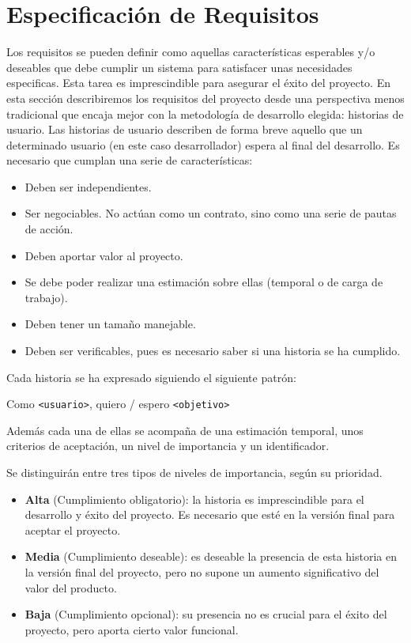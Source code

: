 \chapter{Especificación de Requisitos}
\label{sec::requisitos}
Los requisitos se pueden definir como aquellas características esperables y/o deseables que debe cumplir un sistema para satisfacer unas necesidades especificas. Esta tarea es imprescindible para asegurar el éxito del proyecto. En esta sección describiremos los requisitos del proyecto desde una perspectiva menos tradicional que encaja mejor con la metodología de desarrollo elegida: historias de usuario. Las historias de usuario describen de forma breve aquello que un determinado usuario (en este caso desarrollador) espera al final del desarrollo. Es necesario que cumplan una serie de características:
\begin{itemize}
    \item Deben ser independientes.
    \item Ser negociables. No actúan como un contrato, sino como una serie de pautas de acción.
    \item Deben aportar valor al proyecto.
    \item Se debe poder realizar una estimación sobre ellas (temporal o de carga de trabajo).
    \item Deben tener un tamaño manejable.
    \item Deben ser verificables, pues es necesario saber si una historia se ha cumplido.
\end{itemize}

Cada historia se ha expresado siguiendo el siguiente patrón:
\begin{center}
    Como \texttt{<usuario>}, quiero / espero \texttt{<objetivo>}
\end{center}

Además cada una de ellas se acompaña de una estimación temporal, unos criterios de aceptación, un nivel de importancia y un identificador.

Se distinguirán entre tres tipos de niveles de importancia, según su prioridad.
\begin{itemize}
    \item \textbf{Alta} (Cumplimiento obligatorio): la historia es imprescindible para el desarrollo y éxito del proyecto. Es necesario que esté en la versión final para aceptar el proyecto.
    \item \textbf{Media} (Cumplimiento deseable): es deseable la presencia de esta historia en la versión final del proyecto, pero no supone un aumento significativo del valor del producto.
    \item \textbf{Baja} (Cumplimiento opcional): su presencia no es crucial para el éxito del proyecto, pero aporta cierto valor funcional. 
\end{itemize}

